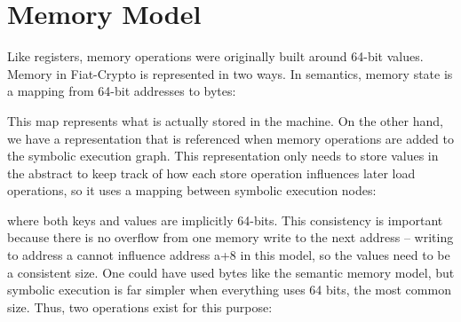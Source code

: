 

\section{Memory Model}
\label{sec:mem-model}

Like registers, memory operations were originally built around 64-bit values.
Memory in Fiat-Crypto is represented in two ways.
In semantics, memory state is a mapping from 64-bit addresses to bytes:


This map represents what is actually stored in the machine.
On the other hand, we have a representation that is referenced when memory operations are added to the symbolic execution graph.
This representation only needs to store values in the abstract to keep track of how each store operation influences later load operations, so it uses a mapping between symbolic execution nodes:


\noindent where both keys and values are implicitly 64-bits.
This consistency is important because there is no overflow from one memory write to the next address -- writing to address a cannot influence address a+8 in this model, so the values need to be a consistent size.
One could have used bytes like the semantic memory model, but symbolic execution is far simpler when everything uses 64 bits, the most common size.
Thus, two operations exist for this purpose:

